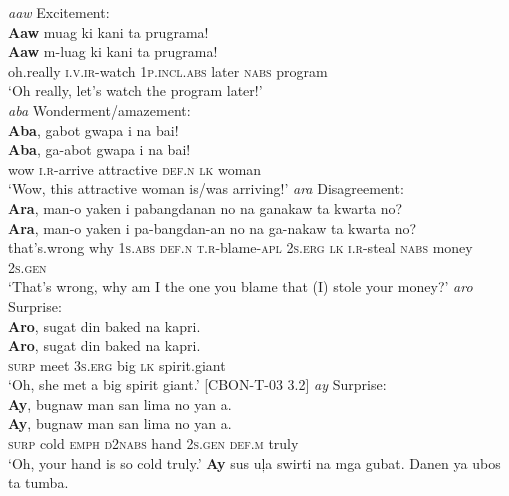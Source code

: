 \ea 
\label{bkm:Ref329594720}
\textit{aaw} Excitement: \\
\textbf{Aaw}  muag  ki  kani  ta  prugrama! \\\smallskip
\gll \textbf{Aaw}  m-luag  ki  kani  ta  prugrama! \\
oh.really  \textsc{i.v.ir}-watch  1\textsc{p.incl.abs}  later  \textsc{nabs}  program \\
\glt ‘Oh really, let’s watch the program later!’ \\
\z
\ea
\label{bkm:Ref118535175}
\textit{aba} Wonderment/amazement: \\
\textbf{Aba},  gabot  gwapa  i  na  bai! \\\smallskip
\gll \textbf{Aba},  ga-abot  gwapa  i  na  bai! \\
wow  \textsc{i.r}-arrive  attractive  \textsc{def.n}  \textsc{lk}  woman \\
\glt ‘Wow, this attractive woman is/was arriving!’
\z
\ea
\label{bkm:Ref118535248}
\textit{ara} Disagreement: \\
\textbf{Ara},  man-o  yaken  i  pabangdanan  no  na  ganakaw ta  kwarta  no? \\\smallskip
\gll \textbf{Ara},  man-o  yaken  i  pa-bangdan-an  no  na  ga-nakaw ta  kwarta  no? \\
that’s.wrong  why  1\textsc{s.abs}  \textsc{def.n}  \textsc{t.r}-blame-\textsc{apl}  2\textsc{s.erg}  \textsc{lk}  \textsc{i.r}-steal \textsc{nabs}  money  2\textsc{s.gen} \\
\glt ‘That’s wrong, why am I the one you blame that (I) stole your money?’
\z
\ea 
\label{bkm:Ref118535339}
\textit{aro} Surprise: \\
\textbf{Aro},  sugat  din  baked  na  kapri. \\\smallskip
\gll \textbf{Aro},  sugat  din  baked  na  kapri. \\
\textsc{surp}  meet  3\textsc{s.erg}  big  \textsc{lk}  spirit.giant \\
\glt ‘Oh, she met a big spirit giant.’ [CBON-T-03 3.2]
\z
\ea
\label{bkm:Ref329594818}
\textit{ay} Surprise: \\
\textbf{Ay},  bugnaw  man  san  lima  no  yan  a. \\\smallskip
\gll \textbf{Ay},  bugnaw  man  san  lima  no  yan  a. \\
\textsc{surp}  cold  \textsc{emph}  \textsc{d}2\textsc{nabs}  hand  2\textsc{s.gen}  \textsc{def.m}  truly \\
\glt ‘Oh, your hand is so cold truly.’
\z
\ea
\textbf{Ay}  sus  uļa  swirti  na  mga  gubat.  Danen  ya  ubos  ta  tumba. \\\smallskip
